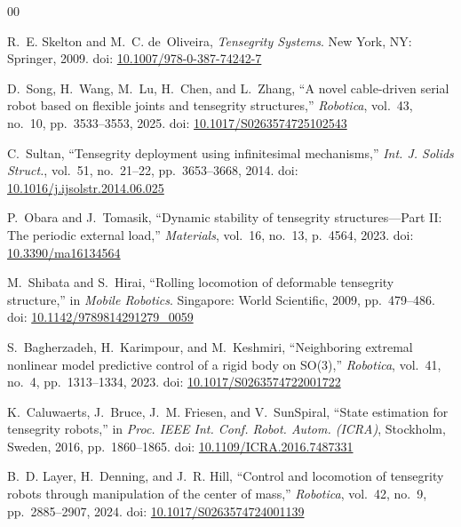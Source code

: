 \documentclass[conference]{IEEEtran}
\begin{document}
\balance
{\small
\begin{thebibliography}{00}

R.~E. Skelton and M.~C. de~Oliveira,
\textit{Tensegrity Systems}.
New York, NY: Springer, 2009.
doi: \href{https://doi.org/10.1007/978-0-387-74242-7}{10.1007/978-0-387-74242-7}

D.~Song, H.~Wang, M.~Lu, H.~Chen, and L.~Zhang,
``A novel cable-driven serial robot based on flexible joints and tensegrity
structures,''
\textit{Robotica}, vol.~43, no.~10, pp.~3533--3553, 2025.
doi: \href{https://doi.org/10.1017/S0263574725102543}{10.1017/S0263574725102543}

C.~Sultan,
``Tensegrity deployment using infinitesimal mechanisms,''
\textit{Int. J. Solids Struct.}, vol.~51, no.~21--22, pp.~3653--3668, 2014.
doi: \href{https://doi.org/10.1016/j.ijsolstr.2014.06.025}{10.1016/j.ijsolstr.2014.06.025}

P.~Obara and J.~Tomasik,
``Dynamic stability of tensegrity structures---{Part II}: The periodic
external load,''
\textit{Materials}, vol.~16, no.~13, p.~4564, 2023.
doi: \href{https://doi.org/10.3390/ma16134564}{10.3390/ma16134564}

M.~Shibata and S.~Hirai,
``Rolling locomotion of deformable tensegrity structure,''
in \textit{Mobile Robotics}.
Singapore: World Scientific, 2009, pp.~479--486.
doi: \href{https://doi.org/10.1142/9789814291279_0059}{10.1142/9789814291279\_0059}

S.~Bagherzadeh, H.~Karimpour, and M.~Keshmiri,
``Neighboring extremal nonlinear model predictive control of a rigid body
on {SO(3)},''
\textit{Robotica}, vol.~41, no.~4, pp.~1313--1334, 2023.
doi: \href{https://doi.org/10.1017/S0263574722001722}{10.1017/S0263574722001722}

K.~Caluwaerts, J.~Bruce, J.~M. Friesen, and V.~SunSpiral,
``State estimation for tensegrity robots,''
in \textit{Proc. IEEE Int. Conf. Robot. Autom. (ICRA)},
Stockholm, Sweden, 2016, pp.~1860--1865.
doi: \href{https://doi.org/10.1109/ICRA.2016.7487331}{10.1109/ICRA.2016.7487331}

B.~D. Layer, H.~Denning, and J.~R. Hill,
``Control and locomotion of tensegrity robots through manipulation of the
center of mass,''
\textit{Robotica}, vol.~42, no.~9, pp.~2885--2907, 2024.
doi: \href{https://doi.org/10.1017/S0263574724001139}{10.1017/S0263574724001139}


\end{thebibliography}}
\end{document}
